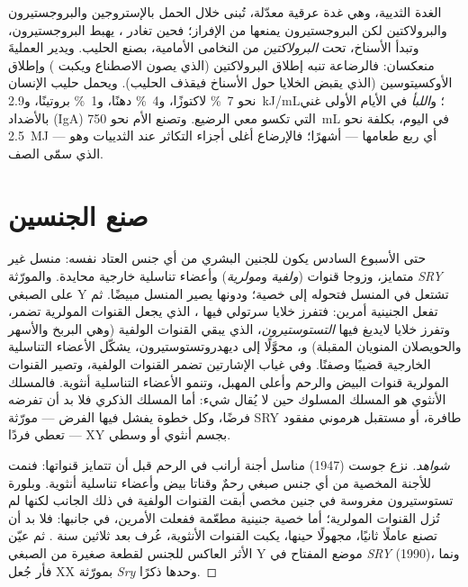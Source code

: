 \begin{proposition}[الإرضاع]\label{prop:b2:mammal-reproduction:lactation}
الغدة الثديية، وهي غدة عرقية معدّلة، تُبنى خلال الحمل
بالإستروجين والبروجستيرون والبرولاكتين لكن البروجستيرون يمنعها من
الإفراز؛ فحين تغادر ، يهبط البروجستيرون، وتبدأ
الأسناخ، تحت \emph{البرولاكتين} من النخامى الأمامية،
بصنع الحليب. ويدير العمليةَ منعكسان: فالرضاعة
تنبه إطلاق البرولاكتين (الذي يصون الاصطناع
ويكبت ) وإطلاق الأوكسيتوسين (الذي يقبض
الخلايا حول الأسناخ فيقذف الحليب). ويحمل حليب الإنسان
نحو \qty{7}{\%} لاكتوزًا، و\qty{4}{\%} دهنًا، و\qty{1}{\%} بروتينًا،
و\qty{2.9}{kJ/mL}؛ و\emph{اللبأ} في الأيام الأولى غني
بالأضداد (IgA) التي تكسو معي الرضيع. وتصنع الأم نحو
\qty{750}{mL} في اليوم، بكلفة نحو \qty{2.5}{MJ} --- أي ربع
طعامها --- أشهرًا؛ فالإرضاع أغلى أجزاء التكاثر
عند الثدييات وهو الذي سمّى الصف.
\end{proposition}

\section{صنع الجنسين}

\begin{proposition}\label{prop:b2:mammal-reproduction:sex}
حتى الأسبوع السادس يكون للجنين البشري من أي جنس العتاد
نفسه: منسل غير متمايز، وزوجا قنوات (\emph{ولفية}
و\emph{مولرية}) وأعضاء تناسلية خارجية محايدة. والمورّثة
\emph{SRY} على الصبغي Y تشتعل في المنسل فتحوله
إلى خصية؛ ودونها يصير المنسل مبيضًا. ثم تفعل 
الجنينية أمرين: فتفرز خلايا سرتولي فيها
\emph{}، الذي يجعل القنوات المولرية
تضمر، وتفرز خلايا لايديغ فيها \emph{التستوستيرون}، الذي
يبقي القنوات الولفية (وهي البربخ والأسهر
والحويصلان المنويان المقبلة) و، محوَّلًا إلى ديهدروتستوستيرون، يشكّل
الأعضاء التناسلية الخارجية قضيبًا وصفنًا. وفي غياب
الإشارتين تضمر القنوات الولفية، وتصير القنوات المولرية
قنوات البيض والرحم وأعلى المهبل، وتنمو الأعضاء التناسلية
أنثوية. فالمسلك الأنثوي هو المسلك المسلوك حين لا يُقال شيء:
أما المسلك الذكري فلا بد أن تفرضه  فرضًا، وكل خطوة
يفشل فيها الفرض --- مورّثة SRY طافرة، أو مستقبل هرموني
مفقود --- تعطي فردًا XY بجسم أنثوي أو وسطي.
\end{proposition}
\begin{proof}[شواهد]
نزع جوست (1947) مناسل أجنة أرانب في الرحم
قبل أن تتمايز قنواتها: فنمت للأجنة المخصية من أي جنس
صبغي رحمٌ وقناتا بيض وأعضاء تناسلية
أنثوية. وبلورة تستوستيرون مغروسة في جنين مخصي
أبقت القنوات الولفية في ذلك الجانب لكنها لم تُزل
القنوات المولرية؛ أما خصية جنينية مطعّمة ففعلت الأمرين، في جانبها:
فلا بد أن تصنع  عاملًا ثانيًا، مجهولًا حينها، يكبت
القنوات الأنثوية، عُرف بعد ثلاثين سنة . ثم عيّن الأثر العاكس للجنس لقطعة صغيرة من الصبغي Y
موضع المفتاح في \emph{SRY} (1990)، ونما فأر جُعل
XX بمورّثة \emph{Sry} وحدها ذكرًا.
\end{proof}


